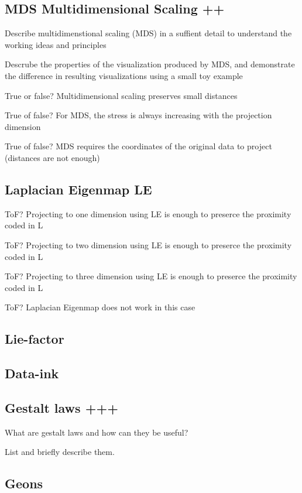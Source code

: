 \documentclass[a4paper]{article}
\begin{document}
\subsection{MDS Multidimensional Scaling ++}

Describe multidimenstional scaling (MDS) in a suffient detail to understand the working ideas and principles

Descrube the properties of the visualization produced by MDS, and demonstrate the difference in resulting visualizations using a small toy example

True or false? Multidimensional scaling preserves small distances

True of false? For MDS, the stress is always increasing with the projection dimension

True of false? MDS requires the coordinates of the original data to project (distances are not enough)

\subsection{Laplacian Eigenmap LE}

ToF? Projecting to one dimension using LE is enough to preserce the proximity coded in L

ToF? Projecting to two dimension using LE is enough to preserce the proximity coded in L

ToF? Projecting to three dimension using LE is enough to preserce the proximity coded in L

ToF? Laplacian Eigenmap does not work in this case

\subsection{Lie-factor}

\subsection{Data-ink}

\subsection{Gestalt laws +++}

What are gestalt laws and how can they be useful?

List and briefly describe them.

\subsection{Geons}
\end{document}
